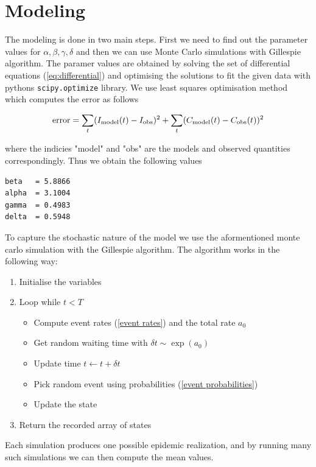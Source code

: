 \section*{Modeling}

The modeling is done in two main steps. First we need to find out the parameter values for $\alpha, \beta, \gamma, \delta$ and then we can use Monte Carlo simulations with Gillespie algorithm. The paramer values are obtained by solving the set of differential equations (\ref{eq:differential}) and optimising the solutions to fit the given data with pythons \texttt{scipy.optimize} library. We use least squares optimisation method which computes the error as follows

\begin{equation*}
    {\rm error} = \sum_t (I_{\rm model}(t) - I_{\rm obs})^2 + \sum_t (C_{\rm model}(t) - C_{\rm obs}(t))^2
\end{equation*}

where the indicies "model" and "obs" are the models and observed quantities correspondingly. Thus we obtain the following values

\begin{lstlisting}
beta   = 5.8866
alpha  = 3.1004
gamma  = 0.4983
delta  = 0.5948
\end{lstlisting}

To capture the stochastic nature of the model we use the aformentioned monte carlo simulation with the Gillespie algorithm. The algorithm works in the following way:

\begin{enumerate}
  \item Initialise the variables
  \item Loop while $t < T$
  \begin{itemize}
    \item Compute event rates (\ref{event rates}) and the total rate $a_0$
    \item Get random waiting time with $\delta t \sim \exp(a_0)$
    \item Update time $t \leftarrow t + \delta t$
    \item Pick random event using probabilities (\ref{event probabilities})
    \item Update the state
  \end{itemize}
  \item Return the recorded array of states
\end{enumerate}

Each simulation produces one possible epidemic realization, and by running many such simulations we can then compute the mean values. 

